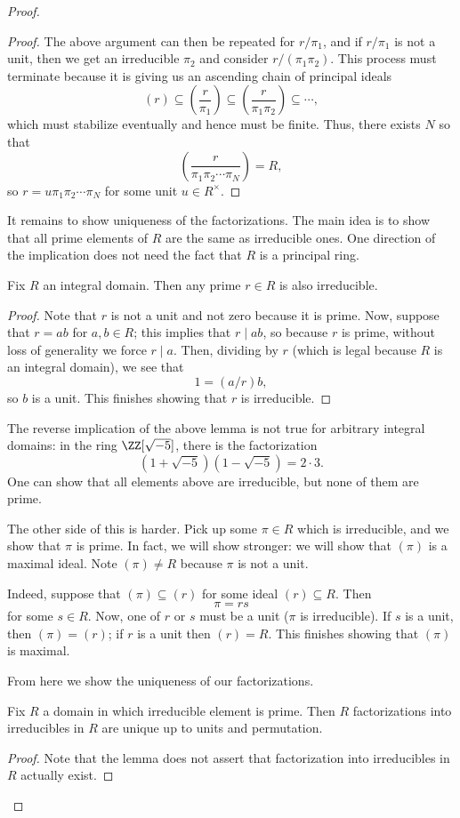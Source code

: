 \begin{proof}
\begin{proof}
		The above argument can then be repeated for $r/\pi_1$, and if $r/\pi_1$ is not a unit, then we get an irreducible $\pi_2$ and consider $r/(\pi_1\pi_2)$. This process must terminate because it is giving us an ascending chain of principal ideals
		\[(r)\subseteq\left(\frac r{\pi_1}\right)\subseteq\left(\frac r{\pi_1\pi_2}\right)\subseteq\cdots,\]
		which must stabilize eventually and hence must be finite. Thus, there exists $N$ so that
		\[\left(\frac r{\pi_1\pi_2\cdots\pi_N}\right)=R,\]
		so $r=u\pi_1\pi_2\cdots\pi_N$ for some unit $u\in R^\times$.
	\end{proof}
	It remains to show uniqueness of the factorizations. The main idea is to show that all prime elements of $R$ are the same as irreducible ones. One direction of the implication does not need the fact that $R$ is a principal ring.
	\begin{lemma}
		Fix $R$ an integral domain. Then any prime $r\in R$ is also irreducible.
	\end{lemma}
	\begin{proof}
		Note that $r$ is not a unit and not zero because it is prime. Now, suppose that $r=ab$ for $a,b\in R$; this implies that $r\mid ab$, so because $r$ is prime, without loss of generality we force $r\mid a$. Then, dividing by $r$ (which is legal because $R$ is an integral domain), we see that
		\[1=(a/r)b,\]
		so $b$ is a unit. This finishes showing that $r$ is irreducible.
	\end{proof}
	\begin{warn}
		The reverse implication of the above lemma is not true for arbitrary integral domains: in the ring $\ZZ[\sqrt{-5}]$, there is the factorization
		\[\left(1+\sqrt{-5}\right)\left(1-\sqrt{-5}\right)=2\cdot3.\]
		One can show that all elements above are irreducible, but none of them are prime.
	\end{warn}
	The other side of this is harder. Pick up some $\pi\in R$ which is irreducible, and we show that $\pi$ is prime. In fact, we will show stronger: we will show that $(\pi)$ is a maximal ideal. Note $(\pi)\ne R$ because $\pi$ is not a unit.
	
	Indeed, suppose that $(\pi)\subseteq(r)$ for some ideal $(r)\subseteq R$. Then
	\[\pi=rs\]
	for some $s\in R$. Now, one of $r$ or $s$ must be a unit ($\pi$ is irreducible). If $s$ is a unit, then $(\pi)=(r)$; if $r$ is a unit then $(r)=R$. This finishes showing that $(\pi)$ is maximal.

	From here we show the uniqueness of our factorizations.
	\begin{lemma} \label{lem:factuniq}
		Fix $R$ a domain in which irreducible element is prime. Then $R$ factorizations into irreducibles in $R$ are unique up to units and permutation.
	\end{lemma}
	\begin{proof}
		Note that the lemma does not assert that factorization into irreducibles in $R$ actually exist.


\end{proof}
\end{proof}
